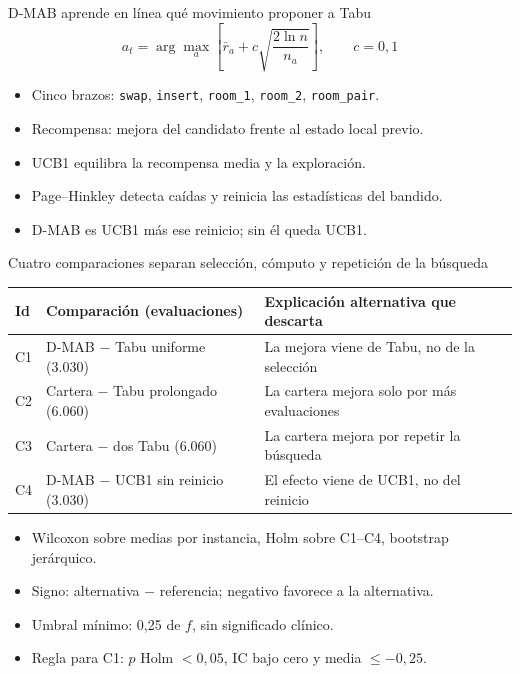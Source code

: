 \documentclass[aspectratio=169,11pt]{beamer}
\begin{document}
\begin{frame}{D-MAB aprende en línea qué movimiento proponer a Tabu}
  \[
    a_t=\arg\max_{a}\left[\bar r_a+c\sqrt{\frac{2\ln n}{n_a}}\right],
    \qquad c=0{,}1
  \]
  \begin{itemize}
    \item Cinco brazos: \texttt{swap}, \texttt{insert}, \texttt{room\_1}, \texttt{room\_2}, \texttt{room\_pair}.
    \item Recompensa: mejora del candidato frente al estado local previo.
    \item UCB1 equilibra la recompensa media y la exploración.
    \item Page--Hinkley detecta caídas y reinicia las estadísticas del bandido.
    \item D-MAB es UCB1 más ese reinicio; sin él queda UCB1.
  \end{itemize}
\end{frame}


\begin{frame}{Cuatro comparaciones separan selección, cómputo y repetición de la búsqueda}
  \centering\footnotesize
  \begin{tabular}{@{}lll@{}}
    \toprule
    Id & Comparación (evaluaciones) & Explicación alternativa que descarta\\
    \midrule
    C1 & D-MAB $-$ Tabu uniforme (3.030) & La mejora viene de Tabu, no de la selección\\
    C2 & Cartera $-$ Tabu prolongado (6.060) & La cartera mejora solo por más evaluaciones\\
    C3 & Cartera $-$ dos Tabu (6.060) & La cartera mejora por repetir la búsqueda\\
    C4 & D-MAB $-$ UCB1 sin reinicio (3.030) & El efecto viene de UCB1, no del reinicio\\
    \bottomrule
  \end{tabular}

  \vspace{0.3cm}
  \raggedright\normalsize
  \begin{itemize}
    \item Wilcoxon sobre medias por instancia, Holm sobre C1--C4, bootstrap jerárquico.
    \item Signo: alternativa $-$ referencia; negativo favorece a la alternativa.
    \item Umbral mínimo: 0,25 de $f$, sin significado clínico.
    \item Regla para C1: $p$ Holm $<0{,}05$, IC bajo cero y media $\le -0{,}25$.
  \end{itemize}
\end{frame}
\end{document}
